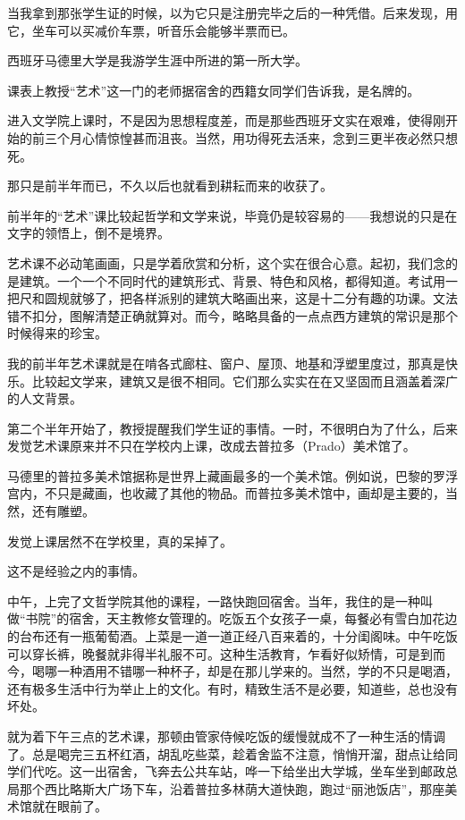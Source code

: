 \par 当我拿到那张学生证的时候，以为它只是注册完毕之后的一种凭借。后来发现，用它，坐车可以买减价车票，听音乐会能够半票而已。
\par 西班牙马德里大学是我游学生涯中所进的第一所大学。
\par 课表上教授“艺术”这一门的老师据宿舍的西籍女同学们告诉我，是名牌的。
\par 进入文学院上课时，不是因为思想程度差，而是那些西班牙文实在艰难，使得刚开始的前三个月心情惊惶甚而沮丧。当然，用功得死去活来，念到三更半夜必然只想死。
\par 那只是前半年而已，不久以后也就看到耕耘而来的收获了。
\par 前半年的“艺术”课比较起哲学和文学来说，毕竟仍是较容易的——我想说的只是在文字的领悟上，倒不是境界。
\par 艺术课不必动笔画画，只是学着欣赏和分析，这个实在很合心意。起初，我们念的是建筑。一个一个不同时代的建筑形式、背景、特色和风格，都得知道。考试用一把尺和圆规就够了，把各样派别的建筑大略画出来，这是十二分有趣的功课。文法错不扣分，图解清楚正确就算对。而今，略略具备的一点点西方建筑的常识是那个时候得来的珍宝。
\par 我的前半年艺术课就是在啃各式廊柱、窗户、屋顶、地基和浮塑里度过，那真是快乐。比较起文学来，建筑又是很不相同。它们那么实实在在又坚固而且涵盖着深广的人文背景。
\par 第二个半年开始了，教授提醒我们学生证的事情。一时，不很明白为了什么，后来发觉艺术课原来并不只在学校内上课，改成去普拉多（Prado）美术馆了。
\par 马德里的普拉多美术馆据称是世界上藏画最多的一个美术馆。例如说，巴黎的罗浮宫内，不只是藏画，也收藏了其他的物品。而普拉多美术馆中，画却是主要的，当然，还有雕塑。
\par 发觉上课居然不在学校里，真的呆掉了。
\par 这不是经验之内的事情。
\par 中午，上完了文哲学院其他的课程，一路快跑回宿舍。当年，我住的是一种叫做“书院”的宿舍，天主教修女管理的。吃饭五个女孩子一桌，每餐必有雪白加花边的台布还有一瓶葡萄酒。上菜是一道一道正经八百来着的，十分闺阁味。中午吃饭可以穿长裤，晚餐就非得半礼服不可。这种生活教育，乍看好似矫情，可是到而今，喝哪一种酒用不错哪一种杯子，却是在那儿学来的。当然，学的不只是喝酒，还有极多生活中行为举止上的文化。有时，精致生活不是必要，知道些，总也没有坏处。
\par 就为着下午三点的艺术课，那顿由管家侍候吃饭的缓慢就成不了一种生活的情调了。总是喝完三五杯红酒，胡乱吃些菜，趁着舍监不注意，悄悄开溜，甜点让给同学们代吃。这一出宿舍，飞奔去公共车站，哗一下给坐出大学城，坐车坐到邮政总局那个西比略斯大广场下车，沿着普拉多林荫大道快跑，跑过“丽池饭店”，那座美术馆就在眼前了。
